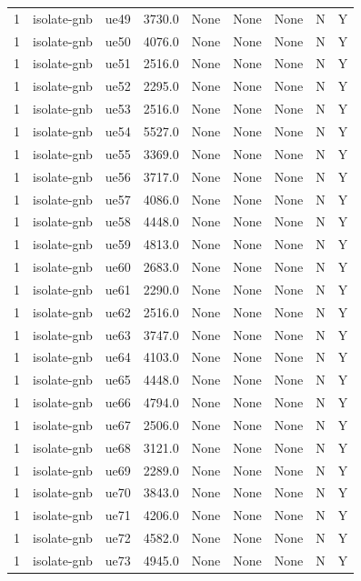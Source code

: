 \begin{table}[ht]
\begin{tabular}{|c|c|c|c|c|c|c|c|c|}
1 & isolate-gnb & ue49 & 3730.0 & None & None & None & N & Y \\
1 & isolate-gnb & ue50 & 4076.0 & None & None & None & N & Y \\
1 & isolate-gnb & ue51 & 2516.0 & None & None & None & N & Y \\
1 & isolate-gnb & ue52 & 2295.0 & None & None & None & N & Y \\
1 & isolate-gnb & ue53 & 2516.0 & None & None & None & N & Y \\
1 & isolate-gnb & ue54 & 5527.0 & None & None & None & N & Y \\
1 & isolate-gnb & ue55 & 3369.0 & None & None & None & N & Y \\
1 & isolate-gnb & ue56 & 3717.0 & None & None & None & N & Y \\
1 & isolate-gnb & ue57 & 4086.0 & None & None & None & N & Y \\
1 & isolate-gnb & ue58 & 4448.0 & None & None & None & N & Y \\
1 & isolate-gnb & ue59 & 4813.0 & None & None & None & N & Y \\
1 & isolate-gnb & ue60 & 2683.0 & None & None & None & N & Y \\
1 & isolate-gnb & ue61 & 2290.0 & None & None & None & N & Y \\
1 & isolate-gnb & ue62 & 2516.0 & None & None & None & N & Y \\
1 & isolate-gnb & ue63 & 3747.0 & None & None & None & N & Y \\
1 & isolate-gnb & ue64 & 4103.0 & None & None & None & N & Y \\
1 & isolate-gnb & ue65 & 4448.0 & None & None & None & N & Y \\
1 & isolate-gnb & ue66 & 4794.0 & None & None & None & N & Y \\
1 & isolate-gnb & ue67 & 2506.0 & None & None & None & N & Y \\
1 & isolate-gnb & ue68 & 3121.0 & None & None & None & N & Y \\
1 & isolate-gnb & ue69 & 2289.0 & None & None & None & N & Y \\
1 & isolate-gnb & ue70 & 3843.0 & None & None & None & N & Y \\
1 & isolate-gnb & ue71 & 4206.0 & None & None & None & N & Y \\
1 & isolate-gnb & ue72 & 4582.0 & None & None & None & N & Y \\
1 & isolate-gnb & ue73 & 4945.0 & None & None & None & N & Y \\

\end{tabular}
\end{table}
